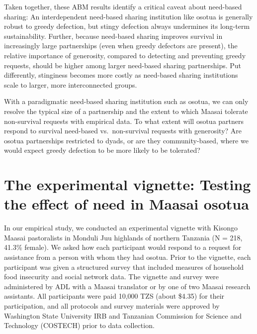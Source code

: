 \documentclass[
]{article}
\begin{document}
Taken together, these ABM results identify a critical caveat about need-based sharing: An interdependent need-based sharing institution like osotua is generally robust to greedy defection, but stingy defection always undermines its long-term sustainability. Further, because need-based sharing improves survival in increasingly large partnerships (even when greedy defectors are present), the relative importance of generosity, compared to detecting and preventing greedy requests, should be higher among larger need-based sharing partnerships. Put differently, stinginess becomes more costly as need-based sharing institutions scale to larger, more interconnected groups.

With a paradigmatic need-based sharing institution such as osotua, we can only resolve the typical size of a partnership and the extent to which Maasai tolerate non-survival requests with empirical data. To what extent will osotua partners respond to survival need-based vs.~non-survival requests with generosity? Are osotua partnerships restricted to dyads, or are they community-based, where we would expect greedy defection to be more likely to be tolerated?

\section{The experimental vignette: Testing the effect of need in Maasai osotua}\label{experiment}

In our empirical study, we conducted an experimental vignette with Kisongo Maasai pastoralists in Monduli Juu highlands of northern Tanzania (N = 218, 41.3\% female). We asked how each participant would respond to a request for assistance from a person with whom they had osotua. Prior to the vignette, each participant was given a structured survey that included measures of household food insecurity and social network data. The vignette and survey were administered by ADL with a Maasai translator or by one of two Maasai research assistants. All participants were paid 10,000 TZS (about \$4.35) for their participation, and all protocols and survey materials were approved by Washington State University IRB and Tanzanian Commission for Science and Technology (COSTECH) prior to data collection.
\end{document}
